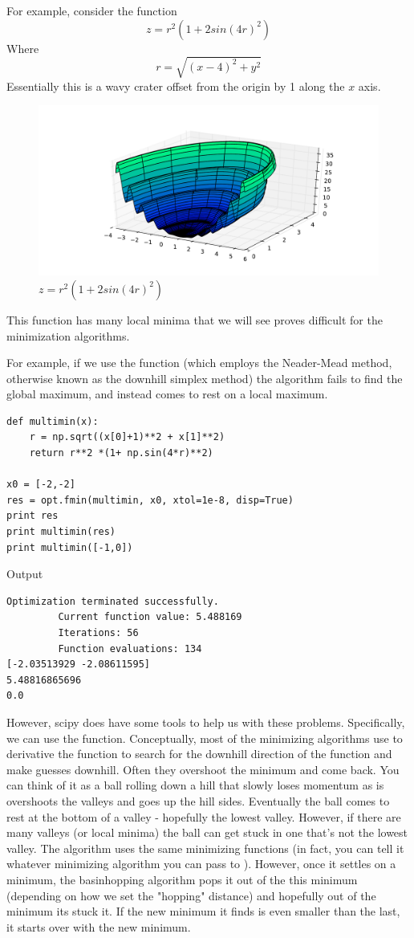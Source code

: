 For example, consider the function
\[
z = r^2 (1+ 2sin(4r)^2)
\]
Where
\[
r = \sqrt{(x-4)^2 + y^2}
\]
Essentially this is a wavy crater offset from the origin by 1 along the $x$ axis.
\begin{figure}
\includegraphics[width=\textwidth]{ManyMinima.pdf}
\caption{$z = r^2 (1+ 2sin(4r)^2)$}
\label{opt:muiltmin}
\end{figure}
This function has many local minima that we will see proves difficult for the minimization algorithms.

For example, if we use the  function (which employs the Neader-Mead method, otherwise known as the downhill simplex method) the algorithm fails to find the global maximum, and instead comes to rest on a local maximum.
\begin{lstlisting}
def multimin(x):
    r = np.sqrt((x[0]+1)**2 + x[1]**2)
    return r**2 *(1+ np.sin(4*r)**2)

x0 = [-2,-2]
res = opt.fmin(multimin, x0, xtol=1e-8, disp=True)
print res
print multimin(res)
print multimin([-1,0])
\end{lstlisting}
Output
\begin{lstlisting}
Optimization terminated successfully.
         Current function value: 5.488169
         Iterations: 56
         Function evaluations: 134
[-2.03513929 -2.08611595]
5.48816865696
0.0
\end{lstlisting}

However, scipy does have some tools to help us with these problems. Specifically, we can use the  function. 
Conceptually, most of the minimizing algorithms use to derivative the function to search for the downhill direction of the function and make guesses downhill. Often they overshoot the minimum and come back. You can think of it as a ball rolling down a hill that slowly loses momentum as is overshoots the valleys and goes up the hill sides. Eventually the ball comes to rest at the bottom of a valley - hopefully the lowest valley. However, if there are many valleys (or local minima) the ball can get stuck in one that's not the lowest valley.
The  algorithm uses the same minimizing functions (in fact, you can tell it whatever minimizing algorithm you can pass to ). However, once it settles on a minimum, the basinhopping algorithm pops it out of the this minimum (depending on how we set the "hopping" distance)  and hopefully out of the minimum its stuck it. If the new minimum it finds is even smaller than the last, it starts over with the new minimum.


